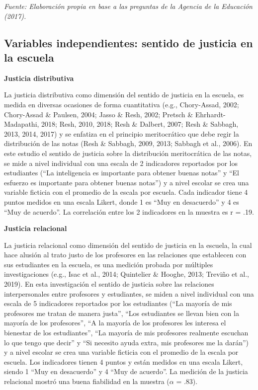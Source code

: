 \documentclass[12pt,twoside]{templates/facsothesis}
\begin{document}
\emph{Fuente: Elaboración propia en base a las preguntas de la Agencia de la Educación (2017).}

\hypertarget{variables-independientes-sentido-de-justicia-en-la-escuela}{%
\subsection{Variables independientes: sentido de justicia en la escuela}\label{variables-independientes-sentido-de-justicia-en-la-escuela}}

\textbf{Justicia distributiva}

La justicia distributiva como dimensión del sentido de justicia en la escuela, es medida en diversas ocasiones de forma cuantitativa (e.g., Chory-Assad, 2002; Chory-Assad \& Paulsen, 2004; Jasso \& Resh, 2002; Pretsch \& Ehrhardt-Madapathi, 2018; Resh, 2010, 2018; Resh \& Dalbert, 2007; Resh \& Sabbagh, 2013, 2014, 2017) y se enfatiza en el principio meritocrático que debe regir la distribución de las notas (Resh \& Sabbagh, 2009, 2013; Sabbagh et al., 2006). En este estudio el sentido de justicia sobre la distribución meritocrática de las notas, se mide a nivel individual con una escala de 2 indicadores reportados por los estudiantes (``La inteligencia es importante para obtener buenas notas'' y ``El esfuerzo es importante para obtener buenas notas'') y a nivel escolar se crea una variable ficticia con el promedio de la escala por escuela. Cada indicador tiene 4 puntos medidos en una escala Likert, donde 1 es ``Muy en desacuerdo'' y 4 es ``Muy de acuerdo''. La correlación entre los 2 indicadores en la muestra es r = .19.

\textbf{Justicia relacional}

La justicia relacional como dimensión del sentido de justicia en la escuela, la cual hace alusión al trato justo de los profesores en las relaciones que establecen con sus estudiantes en la escuela, es una medición probada por múltiples investigaciones (e.g., Isac et al., 2014; Quintelier \& Hooghe, 2013; Treviño et al., 2019). En esta investigación el sentido de justicia sobre las relaciones interpersonales entre profesores y estudiantes, se miden a nivel individual con una escala de 5 indicadores reportados por los estudiantes (``La mayoría de mis profesores me tratan de manera justa'', ``Los estudiantes se llevan bien con la mayoría de los profesores'', ``A la mayoría de los profesores les interesa el bienestar de los estudiantes'', ``La mayoría de mis profesores realmente escuchan lo que tengo que decir'' y ``Si necesito ayuda extra, mis profesores me la darán'') y a nivel escolar se crea una variable ficticia con el promedio de la escala por escuela. Los indicadores tienen 4 puntos y están medidos en una escala Likert, siendo 1 ``Muy en desacuerdo'' y 4 ``Muy de acuerdo''. La medición de la justicia relacional mostró una buena fiabilidad en la muestra (\(\alpha\) = .83).
\end{document}
